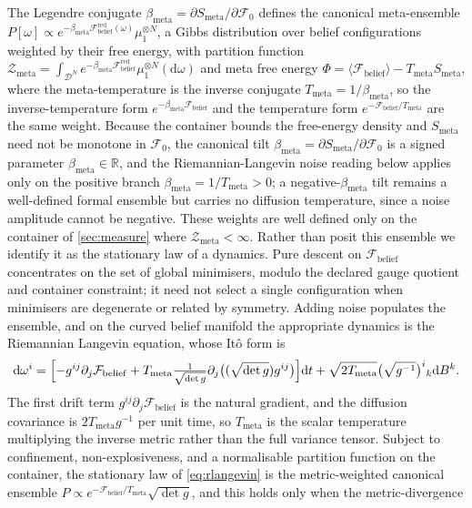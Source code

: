 \documentclass[11pt]{article}
\theoremstyle{plain}
\theoremstyle{definition}
\newcommand{\R}{\mathbb{R}}
\newcommand{\dd}{\mathrm{d}}
\newcommand{\Fcal}{\mathcal{F}}
\newcommand{\Dcal}{\mathcal{D}}
\newcommand{\Zcal}{\mathcal{Z}}
\newcommand{\Smeta}{S_{\mathrm{meta}}}
\newcommand{\Tmeta}{T_{\mathrm{meta}}}
\newcommand{\bmeta}{\beta_{\mathrm{meta}}}
\begin{document}
The Legendre conjugate $\bmeta=\partial\Smeta/\partial\Fcal_0$ defines the canonical
meta-ensemble $P[\omega]\propto e^{-\bmeta\Fcal_{\mathrm{belief}}^{\mathrm{red}}(\omega)}\mu_1^{\otimes N}$, a Gibbs
distribution over belief configurations weighted by their free energy, with partition
function $\Zcal_{\mathrm{meta}}=\int_{\Dcal^{N}} e^{-\bmeta\Fcal_{\mathrm{belief}}^{\mathrm{red}}}\mu_1^{\otimes N}(\dd\omega)$ and meta free energy
$\Phi=\langle\Fcal_{\mathrm{belief}}\rangle-\Tmeta\Smeta$, where the meta-temperature is the inverse
conjugate $\Tmeta=1/\bmeta$, so the inverse-temperature form $e^{-\bmeta\Fcal_{\mathrm{belief}}}$ and
the temperature form $e^{-\Fcal_{\mathrm{belief}}/\Tmeta}$ are the same weight. Because the container bounds the
free-energy density and $\Smeta$ need not be monotone in $\Fcal_0$, the canonical tilt $\bmeta=\partial\Smeta/\partial\Fcal_0$
is a signed parameter $\bmeta\in\R$, and the Riemannian-Langevin noise reading below applies only on the
positive branch $\bmeta=1/\Tmeta>0$; a negative-$\bmeta$ tilt remains a well-defined formal ensemble but
carries no diffusion temperature, since a noise amplitude cannot be negative. These weights are well defined only on the
container of \cref{sec:measure} where $\Zcal_{\mathrm{meta}}<\infty$. Rather than posit
this ensemble we identify it as the stationary law of a dynamics. Pure descent on
$\Fcal_{\mathrm{belief}}$ concentrates on the set of global minimisers, modulo the declared gauge quotient
and container constraint; it need not select a single configuration when minimisers are
degenerate or related by symmetry. Adding noise populates the ensemble, and on the curved
belief manifold the appropriate dynamics is the Riemannian Langevin equation, whose
It\^o form is
\begin{equation}
\label{eq:rlangevin}
\dd\omega^{i}
=\Bigl[-g^{ij}\partial_j\Fcal_{\mathrm{belief}}
+\Tmeta \tfrac{1}{\sqrt{\det g}} \partial_j\bigl((\sqrt{\det g}) g^{ij}\bigr)\Bigr]\dd t
+\sqrt{2\Tmeta}\bigl(\sqrt{g^{-1}}\bigr)^{i}{}_{k}\dd B^{k}.
\end{equation}
The first drift term $g^{ij}\partial_j\Fcal_{\mathrm{belief}}$ is the natural gradient, and the diffusion
covariance is $2\Tmeta g^{-1}$ per unit time, so $\Tmeta$ is the scalar temperature
multiplying the inverse metric rather than the full variance tensor. Subject to
confinement, non-explosiveness, and a normalisable partition function on the container,
the stationary law of \cref{eq:rlangevin} is the metric-weighted canonical ensemble
$P\propto e^{-\Fcal_{\mathrm{belief}}/\Tmeta}\sqrt{\det g}$, and this holds only when the metric-divergence
\end{document}
